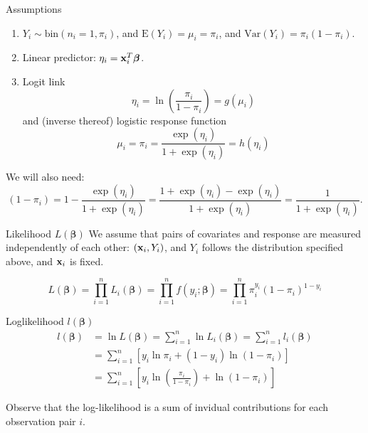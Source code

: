 \documentclass[
  ignorenonframetext,
]{beamer}
\providecommand{\tightlist}{%
  \setlength{\itemsep}{0pt}\setlength{\parskip}{0pt}}
\begin{document}
\begin{frame}
\begin{block}{Assumptions}
\protect\hypertarget{assumptions}{}
\begin{enumerate}
\tightlist
\item
  \(Y_i \sim \text{bin}(n_i=1,\pi_i)\), and
  \(\text{E}(Y_i)=\mu_i=\pi_i\), and \(\text{Var}(Y_i)=\pi_i(1-\pi_i)\).
\item
  Linear predictor: \(\eta_i={\bf x}_i^T \boldsymbol{\beta}\).
\item
  Logit link \[\eta_i=\ln(\frac{\pi_i}{1-\pi_i})=g(\mu_i)\] and (inverse
  thereof) logistic response function
  \[\mu_i=\pi_i=\frac{\exp(\eta_i)}{1+\exp(\eta_i)}=h(\eta_i)\]
\end{enumerate}

We will also need:
\[(1-\pi_i)=1-\frac{\exp(\eta_i)}{1+\exp(\eta_i)}=\frac{1+\exp(\eta_i)-\exp(\eta_i)}{1+\exp(\eta_i)}=\frac{1}{1+\exp(\eta_i)}.\]
\end{block}
\end{frame}

\begin{frame}
\begin{block}{Likelihood \(L(\boldsymbol{\beta})\)}
\protect\hypertarget{likelihood-lboldsymbolbeta}{}
We assume that pairs of covariates and response are measured
independently of each other: \(({\bf x}_i,Y_i)\), and \(Y_i\) follows
the distribution specified above, and \({\bf x}_i\) is fixed.

\[L(\boldsymbol{\beta})=\prod_{i=1}^n L_i(\boldsymbol{\beta})=\prod_{i=1}^n f(y_i; \boldsymbol{\beta})=\prod_{i=1}^n\pi_i^{y_i}(1-\pi_i)^{1-y_i}\]
\end{block}
\end{frame}

\begin{frame}
\begin{block}{Loglikelihood \(l(\boldsymbol{\beta})\)}
\protect\hypertarget{loglikelihood-lboldsymbolbeta}{}
\begin{align}
l(\boldsymbol{\beta})&=\ln L(\boldsymbol{\beta})=\sum_{i=1}^n \ln L_i(\boldsymbol{\beta})=\sum_{i=1}^n l_i(\boldsymbol{\beta})\\
&=\sum_{i=1}^n[y_i \ln \pi_i+(1-y_i) \ln(1-\pi_i)]\\
&=\sum_{i=1}^n[y_i \ln (\frac{\pi_i}{1-\pi_i})+\ln(1-\pi_i)]
\end{align}

Observe that the log-likelihood is a sum of invidual contributions for
each observation pair \(i\).
\end{block}
\end{frame}
\end{document}
